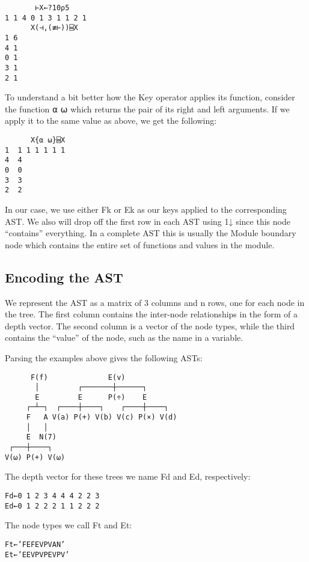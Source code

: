 \documentclass[pldi]{sigplanconf-pldi15}
\begin{document}
\begin{verbatim}
       ⊢X←?10⍴5
1 1 4 0 1 3 1 1 2 1
      X(⊣,(≢⊢))⌸X
1 6
4 1
0 1
3 1
2 1
\end{verbatim}

To understand a bit better how the Key operator applies its function, consider the function {⍺ ⍵} 
which returns the pair of its right and left arguments. If we apply it to the same value as above, we 
get the following:

\begin{verbatim}
      X{⍺ ⍵}⌸X
1  1 1 1 1 1 1 
4  4           
0  0           
3  3           
2  2
\end{verbatim}

In our case, we use either Fk or Ek as our keys applied to the corresponding AST. We also will drop off 
the first row in each AST using 1↓ since this node “contains” everything. In a complete AST this is 
usually the Module boundary node which contains the entire set of functions and values in the module.
\subsection{Encoding the AST}

We represent the AST as a matrix of 3 columns and n rows, one for each node in the tree. The first column 
contains the inter-node relationships in the form of a depth vector. The second column is a vector of the 
node types, while the third contains the “value” of the node, such as the name in a variable. 

Parsing the examples above gives the following ASTs:

\begin{verbatim}
      F(f)              E(v)
       │         ┌───────┼──────┐
       E         E      P(÷)    E
     ┌─┴─┐  ┌────┼────┐    ┌────┼────┐
     F   A V(a) P(+) V(b) V(c) P(×) V(d)
     │   │
     E  N(7) 
 ┌───┼────┐
V(⍵) P(+) V(⍵)
\end{verbatim}

The depth vector for these trees we name Fd and Ed, respectively:

\begin{verbatim}
Fd←0 1 2 3 4 4 4 2 2 3
Ed←0 1 2 2 2 1 1 2 2 2
\end{verbatim}

The node types we call Ft and Et:

\begin{verbatim}
Ft←’FEFEVPVAN’
Et←’EEVPVPEVPV’
\end{verbatim}
\end{document}
